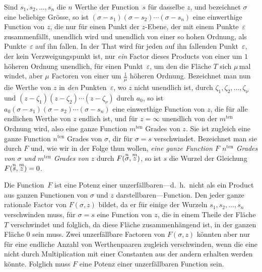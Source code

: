 \documentclass[a4paper,12pt,leqno]{article}
\begin{document}
Sind $s_1, s_2,\ldots, s_n$ die $n$ Werthe der Function~$s$
f\"{u}r dasselbe $z$, und bezeichnet $\sigma$ eine beliebige
Gr\"{o}sse, so ist
$(\sigma - s_1) (\sigma - s_2) \cdots (\sigma - s_n)$
eine einwerthige Function von $z$, die nur f\"{u}r einen Punkt
der $z$-Ebene, der mit einem Punkte~$\varepsilon$
zusammenf\"{a}llt, unendlich wird und unendlich von einer so
hohen Ordnung, als Punkte~$\varepsilon$ auf ihn fallen.  In der
That wird f\"{u}r jeden auf ihn fallenden Punkt~$\varepsilon$,
der kein Verzweigungspunkt ist, nur \emph{ein} Factor dieses
Products von einer um $1$ h\"{o}heren Ordnung unendlich, f\"{u}r
einen Punkt~$\varepsilon$, um den die Fl\"{a}che $T$ sich
$\mu \,$\-mal windet, aber $\mu$ Factoren von einer um
$\displaystyle\frac{1}{\mu}$ h\"{o}heren Ordnung.  Bezeichnet man
nun die Werthe von $z$ in \emph{den} Punkten~$\varepsilon$, wo
$z$ nicht unendlich ist, durch
$\zeta_1, \zeta_2,\ldots, \zeta_\nu$
und
$(z - \zeta_1) (z - \zeta_2) \cdots (z - \zeta_\nu)$
durch $a_0$, so ist
$a_0 (\sigma - s_1) (\sigma - s_2) \cdots (\sigma - s_n)$
eine einwerthige Function von $z$, die f\"{u}r alle endlichen
Werthe von $z$ endlich ist, und f\"{u}r $z = \infty$ unendlich
von der $m^{\mathrm{ten}}$ Ordnung wird, also eine ganze Function
$m^{\mathrm{ten}}$ Grades von $z$.  Sie ist zugleich eine ganze
Function $n^{\mathrm{ten}}$ Grades von $\sigma$, dir f\"{u}r
$\sigma = s$ verschwindet.  Bezeichnet man sie durch $F$ und, wie
wir in der Folge thun wollen, \emph{eine ganze Function $F$
$n^{\mathrm{ten}}$ Grades von $\sigma$ und $m^{\mathrm{ten}}$
Grades von $z$} durch
$F( {\buildrel n \over \sigma}, {\buildrel m \over z} )$,
so ist $s$ die Wurzel der Gleichung
$F( {\buildrel n \over s}, {\buildrel m \over z} ) = 0$.

Die Function~$F$ ist eine Potenz einer
unzerf\"{a}llbaren---d.~h.\ nicht als ein Product aus ganzen
Functionen von $\sigma$ und $z$ darstellbaren---Function.  Den
jeder ganze rationale Factor von $F(\sigma, z)$ bildet, da er
f\"{u}r einige der Wurzeln $s_1, s_2,\ldots, s_n$ verschwinden
muss, f\"{u}r $\sigma = s$ eine Function von $z$, die in einem
Theile der Fl\"{a}che $T$ verschwindet und folglich, da diese
Fl\"{a}che zusammenh\"{a}ngend ist, in der ganzen Fl\"{a}che $0$
sein muss.  Zwei unzerf\"{a}llbare Factoren von $F(\sigma, z)$
k\"{o}nnten aber nur f\"{u}r eine endliche Anzahl von
Werthenpaaren zugleich verschwinden, wenn die eine nicht durch
Multiplication mit einer Constanten aus der andern erhalten
werden k\"{o}nnte.  Folglich muss $F$ eine Potenz einer
unzerf\"{a}llbaren Function sein.
\end{document}
